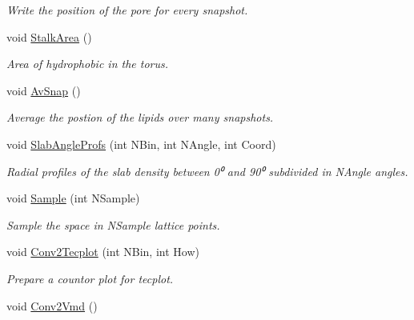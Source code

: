 \begin{DoxyCompactItemize}
\begin{DoxyCompactList}\small\item\em Write the position of the pore for every snapshot. \end{DoxyCompactList}\item 
void \hyperlink{classElPoly_a099625012512857cb5524bf15b397e5e}{Stalk\+Area} ()
\begin{DoxyCompactList}\small\item\em Area of hydrophobic in the torus. \end{DoxyCompactList}\item 
void \hyperlink{classElPoly_aafe33ef0f28995ba7c1a778196decf9b}{Av\+Snap} ()\hypertarget{classElPoly_aafe33ef0f28995ba7c1a778196decf9b}{}\label{classElPoly_aafe33ef0f28995ba7c1a778196decf9b}

\begin{DoxyCompactList}\small\item\em Average the postion of the lipids over many snapshots. \end{DoxyCompactList}\item 
void \hyperlink{classElPoly_a4192d526e79a4c1e0b4910a4f35720c4}{Slab\+Angle\+Profs} (int N\+Bin, int N\+Angle, int Coord)
\begin{DoxyCompactList}\small\item\em Radial profiles of the slab density between 0⁰ and 90⁰ subdivided in N\+Angle angles. \end{DoxyCompactList}\item 
void \hyperlink{classElPoly_ada9b9ef0fea961264425fae43e3a4391}{Sample} (int N\+Sample)\hypertarget{classElPoly_ada9b9ef0fea961264425fae43e3a4391}{}\label{classElPoly_ada9b9ef0fea961264425fae43e3a4391}

\begin{DoxyCompactList}\small\item\em Sample the space in N\+Sample lattice points. \end{DoxyCompactList}\item 
void \hyperlink{classElPoly_ab03f8f580a4b45968aedcaa0d088c469}{Conv2\+Tecplot} (int N\+Bin, int How)\hypertarget{classElPoly_ab03f8f580a4b45968aedcaa0d088c469}{}\label{classElPoly_ab03f8f580a4b45968aedcaa0d088c469}

\begin{DoxyCompactList}\small\item\em Prepare a countor plot for tecplot. \end{DoxyCompactList}\item 
void \hyperlink{classElPoly_a552193e7b9dea6d667fc1cd2ecab1482}{Conv2\+Vmd} ()\hypertarget{classElPoly_a552193e7b9dea6d667fc1cd2ecab1482}{}\label{classElPoly_a552193e7b9dea6d667fc1cd2ecab1482}


\end{DoxyCompactItemize}
